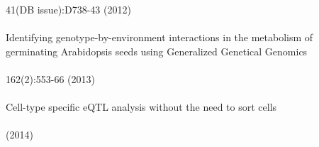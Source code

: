    41(DB issue):D738-43 (2012)\\\\
  Identifying genotype-by-environment interactions in the metabolism of germinating Arabidopsis seeds 
  using Generalized Genetical Genomics\\
  \\
   162(2):553-66 (2013)\\\\
  Cell-type specific eQTL analysis without the need to sort cells\\
  \\
   (2014)

